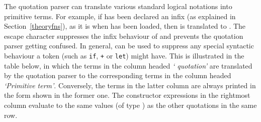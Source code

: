 The \HOL{} quotation parser
%
%
can translate various standard logical
notations
%
%
into primitive terms. For example, if \ml{+} has been declared an
infix
%
%
(as explained in Section~\ref{theoryfns}), as it is when
 has been loaded, then  is
translated to . The escape character \ml{\$}
%
%
suppresses the infix behaviour of \ml{+} and prevents the quotation
parser getting confused.  In general, \ml{\$} can be used to suppress
any special syntactic behaviour a token (such as \texttt{if},
\texttt{+} or \texttt{let})
%
%
might have. This is illustrated in the table below, in which the terms
in the column headed \textit{`\ML{} quotation'} are translated by the
quotation parser to the corresponding terms in the column headed
\textit{`Primitive term'}.  Conversely, the terms in the latter column
are always printed in the form shown in the former one.  The \ML{}
constructor expressions in the rightmost column evaluate to the same
values (of type ) as the other quotations in the same row.

\bigskip

